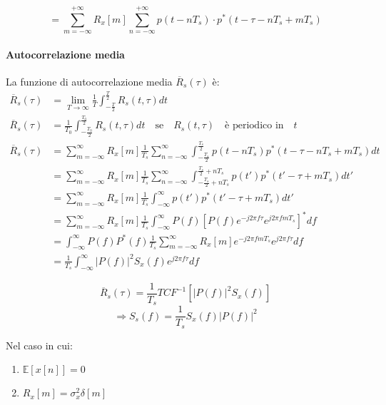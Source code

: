 \[
    = \sum_{m=-\infty}^{+\infty} R_x[m] \sum_{n=-\infty}^{+\infty} p(t - nT_s) \cdot p^*(t - \tau - nT_s + mT_s)
\]

\paragraph*{Autocorrelazione media}

La funzione di autocorrelazione media \( \overline{R}_s(\tau) \) è:
\begin{align*}
    \overline{R}_s(\tau) & = \lim_{T\to\infty} \frac{1}{T} \int_{-\frac{T}{2}}^{\frac{T}{2}} R_s(t, \tau) dt                                                                   \\
    \overline{R}_s(\tau) & = \frac{1}{T_0} \int_{-\frac{T_0}{2}}^{\frac{T_0}{2}} R_s(t,\tau)dt \quad \text{se} \quad R_s(t,\tau) \quad \text{è periodico in} \quad t           \\
    \overline{R}_s(\tau) & = \sum_{m=-\infty}^{\infty} R_x[m] \frac{1}{T_s} \sum_{n=-\infty}^{\infty} \int_{-\frac{T_s}{2}}^{\frac{T_s}{2}} p(t-nT_s)p^*(t-\tau-nT_s+mT_s)dt   \\
                         & = \sum_{m=-\infty}^{\infty} R_x[m] \frac{1}{T_s} \sum_{n=-\infty}^{\infty}\int_{-\frac{T_s}{2}+nT_s}^{\frac{T_s}{2}+nT_s} p(t')p^*(t'-\tau+mT_s)dt' \\
                         & = \sum_{m=-\infty}^{\infty} R_x[m] \frac{1}{T_s} \int_{-\infty}^{\infty} p(t')p^*(t'-\tau+mT_s)dt'                                                  \\
                         & = \sum_{m=-\infty}^{\infty} R_x[m] \frac{1}{T_s} \int_{-\infty}^{\infty} P(f)[P(f)e^{-j2\pi f\tau}e^{j2\pi fmT_s}]^*df                              \\
                         & = \int_{-\infty}^{\infty} P(f)P^*(f)\frac{1}{T_s} \sum_{m=-\infty}^{\infty} R_x[m] e^{-j2\pi fmT_s}e^{j2\pi f\tau}df                                \\
                         & = \frac{1}{T_s} \int_{-\infty}^{\infty} |P(f)|^2 S_x(f)e^{j2\pi f\tau}df
\end{align*}


\[
    \overline{R}_s(\tau) = \frac{1}{T_s} TCF^{-1} \left[ |P(f)|^2 S_x(f) \right]
\]
\[
    \Rightarrow S_s(f) = \frac{1}{T_s} S_x(f) |P(f)|^2
\]

Nel caso in cui:
\begin{enumerate}
    \item $\mathbb{E} [ x[n] ] = 0$
    \item $R_x[m] = \sigma_x^2 \delta[m]$
\end{enumerate}

